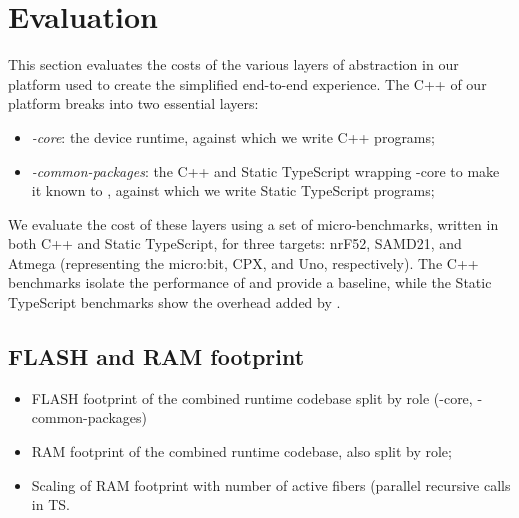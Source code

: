 \section{Evaluation}
\label{sec:evaluate}

This section evaluates the costs of the various layers of abstraction
in our platform used to create the simplified end-to-end experience. 
The C++ of our platform breaks into two essential layers:
\begin{itemize}
\item \emph{\CON-core}: the \CO device runtime, against which we write C++ programs;
\item \emph{\MCN-common-packages}: the C++ and Static TypeScript wrapping \CON-core 
to make it known to \MC, against which we write Static TypeScript programs;
\end{itemize}
We evaluate the cost of these layers using a set of micro-benchmarks, written
in both C++ and Static TypeScript, for three targets: nrF52, SAMD21, and Atmega (representing
the micro:bit, CPX, and Uno, respectively). The C++ benchmarks isolate the performance
of \CO and provide a baseline, while the Static TypeScript benchmarks show the overhead
added by \MC. 


\subsection{FLASH and RAM footprint}

\begin{itemize}

\item FLASH footprint of the combined runtime codebase split by role (\CON-core, \MCN-common-packages)
\item RAM footprint of the combined runtime codebase, also split by role; 
\item Scaling of RAM footprint with number of active fibers (parallel recursive calls in TS. 
\end{itemize}


